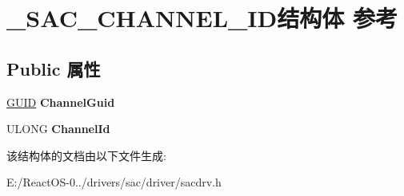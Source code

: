 \hypertarget{struct___s_a_c___c_h_a_n_n_e_l___i_d}{}\section{\+\_\+\+S\+A\+C\+\_\+\+C\+H\+A\+N\+N\+E\+L\+\_\+\+I\+D结构体 参考}
\label{struct___s_a_c___c_h_a_n_n_e_l___i_d}
\subsection*{Public 属性}
\begin{DoxyCompactItemize}
\item 
\mbox{\label{struct___s_a_c___c_h_a_n_n_e_l___i_d_a43683eba3c7806fad538aaf501a5828a}} 
\hyperlink{interface_g_u_i_d}{G\+U\+ID} {\bfseries Channel\+Guid}
\item 
\mbox{\label{struct___s_a_c___c_h_a_n_n_e_l___i_d_a8521a4bd3e19837e3294a3ecddfff41b}} 
U\+L\+O\+NG {\bfseries Channel\+Id}
\end{DoxyCompactItemize}


该结构体的文档由以下文件生成\+:\begin{DoxyCompactItemize}
\item 
E\+:/\+React\+O\+S-\/0../drivers/sac/driver/sacdrv.\+h\end{DoxyCompactItemize}
